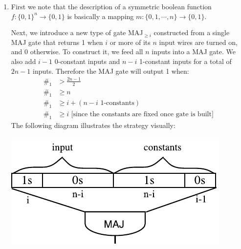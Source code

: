 \documentclass{article}
\begin{document}
\begin{enumerate}
\begin{proof}
Let $s\in V$ be a vertex where the son was taken to by his father. Assume that there is a loop in the path taken by the son and let $(v,w)\in E$ be the first edge that he visits twice in his path $P=(s,\dotsc,u_1,v,w,\dotsc,u_2,v,w,\dotsc)$. By lemma \ref{lemma_deter}, $u_1=u_2$ and $(u_1,v)=(u_2,v)$ is a repeated edge visited before $(u,v)$, which contradicts our assumption. Therefore there cannot be such a loop in his path and he will eventually return to $s$.
\end{proof}

The algorithm only needs to store a constant amount of vertex indices:
\begin{itemize}
\item which vertex the father is visiting
\item which vertex the son visits initially
\item which vertex the son last visited while traversing the graph
\end{itemize}
Therefore the space complexity is $O(\log |V|)$.

\newpage
\item First we note that the description of a symmetric boolean function $f:\{0,1\}^n\rightarrow \{0,1\}$ is basically a mapping $m:\{0,1,\cdots,n\}\rightarrow \{0,1\}$.


Next, we introduce a new type of gate MAJ$_{\geq i}$ constructed from a single MAJ gate that returns 1 when $i$ or more of its $n$ input wires are turned on, and 0 otherwise. To construct it, we feed all $n$ inputs into a MAJ gate. We also add $i-1$ 0-constant inputs and $n-i$ 1-constant inputs for a total of $2n-1$ inputs. Therefore the MAJ gate will output 1 when:
\begin{align*}
\#_1 &> \frac{2n-1}{2} \\
\#_1 &\geq n \\
\#_1 &\geq i + (n-i \text{ 1-constants}) \\
\#_1 &\geq i \text{ [since the constants are fixed once gate is built]}
\end{align*}
The following diagram illustrates the strategy visually:

\includegraphics{q3_maj_geq.pdf}


\end{enumerate}
\end{document}
